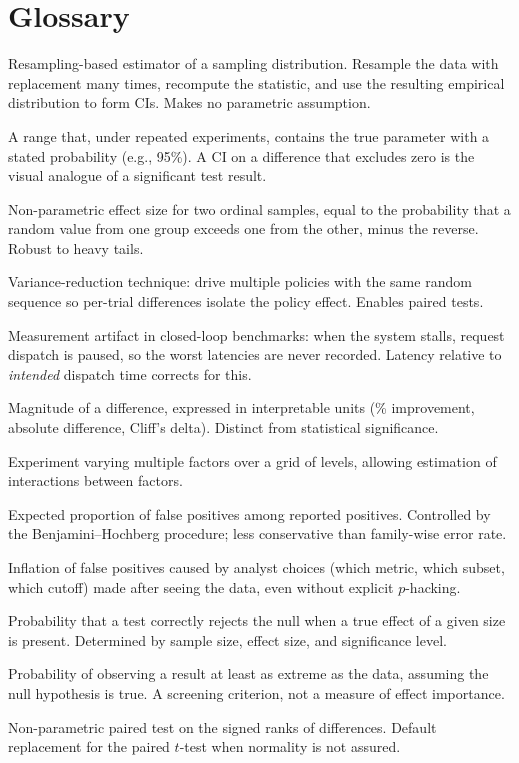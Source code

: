 \documentclass[11pt]{article}
\begin{document}
\section{Glossary}
\label{sec:glossary}

\begin{description}[style=nextline, font=\bfseries, leftmargin=0pt, itemsep=2pt]
    \item[Bootstrap] Resampling-based estimator of a sampling distribution. Resample the data with replacement many times, recompute the statistic, and use the resulting empirical distribution to form CIs. Makes no parametric assumption.
    \item[Confidence interval (CI)] A range that, under repeated experiments, contains the true parameter with a stated probability (e.g., 95\%). A CI on a difference that excludes zero is the visual analogue of a significant test result.
    \item[Cliff's delta] Non-parametric effect size for two ordinal samples, equal to the probability that a random value from one group exceeds one from the other, minus the reverse. Robust to heavy tails.
    \item[Common random numbers (CRN)] Variance-reduction technique: drive multiple policies with the same random sequence so per-trial differences isolate the policy effect. Enables paired tests.
    \item[Coordinated omission] Measurement artifact in closed-loop benchmarks: when the system stalls, request dispatch is paused, so the worst latencies are never recorded. Latency relative to \emph{intended} dispatch time corrects for this.
    \item[Effect size] Magnitude of a difference, expressed in interpretable units (\% improvement, absolute difference, Cliff's delta). Distinct from statistical significance.
    \item[Factorial design] Experiment varying multiple factors over a grid of levels, allowing estimation of interactions between factors.
    \item[FDR (false discovery rate)] Expected proportion of false positives among reported positives. Controlled by the Benjamini--Hochberg procedure; less conservative than family-wise error rate.
    \item[Forking paths] Inflation of false positives caused by analyst choices (which metric, which subset, which cutoff) made after seeing the data, even without explicit $p$-hacking.
    \item[Power] Probability that a test correctly rejects the null when a true effect of a given size is present. Determined by sample size, effect size, and significance level.
    \item[$p$-value] Probability of observing a result at least as extreme as the data, assuming the null hypothesis is true. A screening criterion, not a measure of effect importance.
    \item[Wilcoxon signed-rank] Non-parametric paired test on the signed ranks of differences. Default replacement for the paired $t$-test when normality is not assured.
\end{description}



\end{document}
